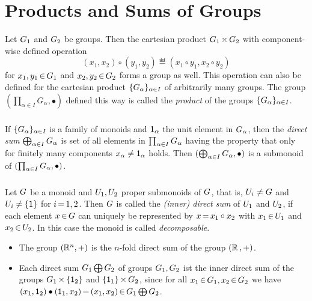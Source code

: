 \documentclass[11pt,twoside]{article}
\begin{document}
\section{Products and Sums of Groups}
Let $G_1$ and $G_2$ be groups.
Then the cartesian product $G_1 {\,\times\,} G_2$
with component-wise defined operation
\[
(x_1,x_2) \circ (y_1,y_2) \eqdef (x_1 \circ y_1, x_2 \circ y_2)
\]
for $x_1,y_1 {\,\in\,} G_1$ and $x_2,y_2 {\,\in\,} G_2$
forms a group as well.
This operation can also be defined for the cartesian product
$\{G_{\alpha}\}_{\alpha \in I}$
of arbitrarily many groups.
The group $(\prod_{\alpha \in I} G_{\alpha}, \bullet)$ defined this way is
called the \textit{product} of the groups $\{G_{\alpha}\}_{\alpha \in I}$.

\subparagraph{}
If $\{G_{\alpha}\}_{\alpha \in I}$ is a family of monoids
and ${\mathsf{1}}_{\alpha}$ the unit element in $G_{\alpha}$,
then the \textit{direct sum} $\bigoplus_{\alpha \in I} G_{\alpha}$
is set of all elements in $\prod_{\alpha \in I} G_{\alpha}$
having the property
that only for finitely many components $x_{\alpha} \neq {\mathsf{1}}_{\alpha}$ holds.
Then $(\bigoplus_{\alpha \in I} G_{\alpha}, \bullet)$
is a submonoid of $(\prod_{\alpha \in I} G_{\alpha}, \bullet)$.

\subparagraph{}
Let $G$ be a monoid and
$U_1,U_2$ proper submonoids of $G$,
that is,
$U_i \neq G$ and $U_i \neq \{{\mathsf{1}}\}$ for $i {\,=\,} 1,2$.
Then $G$ is called the \textit{(inner) direct sum}
of $U_1$ and $U_2$,
if each element $x {\,\in\,} G$ can uniquely be represented by
$x {\,=\,} x_1 \circ x_2$ with $x_1 {\,\in\,} U_1$ and $x_2 {\,\in\,} U_2$.
In this case the monoid is called \textit{decomposable}.

\begin{itemize}[leftmargin=15pt]
\item[1.]
The group $({\mathbb{R}}^n,+)$ is the $n$-fold direct sum of the group $({\mathbb{R}} \, ,+)$.

\item[2.]
Each direct sum $G_1 \bigoplus G_2$ of groups $G_1,G_2$
ist the inner direct sum of the groups
$G_1 {\,\times\,} \{{\mathsf{1}}_2\}$ and
$\{{\mathsf{1}}_1\} {\,\times\,} G_2$,
since for all $x_1 {\,\in\,} G_1, x_2 {\,\in\,} G_2$ we have
$(x_1,{\mathsf{1}}_2) \bullet ({\mathsf{1}}_1,x_2) {\,=\,} (x_1,x_2) {\,\in\,} G_1 \bigoplus G_2$.
\end{itemize}

\end{document}
